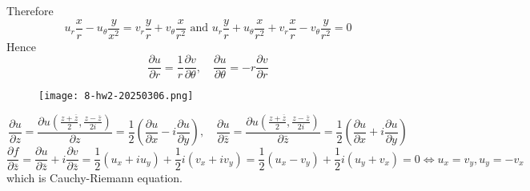Therefore
\[
u_{r}\frac{x}{r}-u_{\theta}\frac{y}{x^{2}} =v_{r}\frac{y}{r}+v_{\theta}\frac{x}{r^{2}}\text{ and }u_{r}\frac{y}{r}+u_{\theta}\frac{x}{r^{2}}+v_{r}\frac{x}{r}-v_{\theta}\frac{y}{r^{2}}=0
\]
Hence
\[
\frac{ \partial u }{ \partial r } =\frac{1}{r}\frac{ \partial v }{ \partial \theta } ,\quad \frac{ \partial u }{ \partial \theta } =-r\frac{ \partial v }{ \partial r }
\]
\begin{figure}[H]
\centering
\texttt{[image: 8-hw2-20250306.png]}
\label{}
\end{figure}
\[
\frac{ \partial u }{ \partial z } =\frac{ \partial u\left( \frac{z+\overline{z}}{2},\frac{z-\overline{z}}{2i} \right) }{ \partial z }=\frac{1}{2}\left( \frac{ \partial u }{ \partial x } -i\frac{ \partial u }{ \partial y }  \right),\quad \frac{ \partial u }{ \partial \bar{z} } =\frac{ \partial u\left( \frac{z+\overline{z}}{2},\frac{z-\overline{z}}{2i} \right) }{ \partial \bar{z} }=\frac{1}{2}\left( \frac{ \partial u }{ \partial x } +i\frac{ \partial u }{ \partial y }  \right)
\]
\[
\frac{ \partial f }{ \partial \bar{z} }=\frac{ \partial u }{ \partial \bar{z} } +i \frac{ \partial v }{ \partial \bar{z} } =\frac{1}{2}(u_{x}+iu_{y})+\frac{1}{2}i(v_{x}+iv_{y})=\frac{1}{2}(u_{x}-v_{y})+\frac{1}{2}i(u_{y}+v_{x})=0\iff u_{x}=v_{y},u_{y}=-v_{x}
\]
which is Cauchy-Riemann equation.
